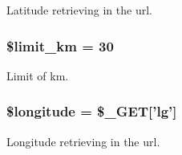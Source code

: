 Latitude retrieving in the url. 

\hypertarget{poi_2nearest_8php_a00de150c5780d1d74512d2f6c6477d22}{
\subsubsection[{\$limit\-\_\-km}]{\setlength{\rightskip}{0pt plus 5cm}\$limit\-\_\-km = 30}}\label{poi_2nearest_8php_a00de150c5780d1d74512d2f6c6477d22}


Limit of km. 

\hypertarget{poi_2nearest_8php_aabb5b5c018fed3789fce382e336cfa47}{
\subsubsection[{\$longitude}]{\setlength{\rightskip}{0pt plus 5cm}\$longitude = \$\-\_\-\-G\-E\-T\mbox{[}'lg'\mbox{]}}}\label{poi_2nearest_8php_aabb5b5c018fed3789fce382e336cfa47}


Longitude retrieving in the url. 

